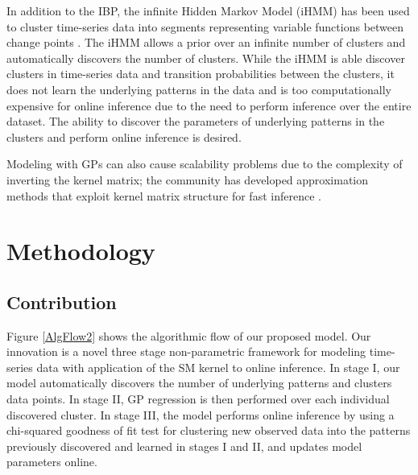 \documentclass{article}
\begin{document}
In addition to the IBP, the infinite Hidden Markov Model (iHMM) has been used to cluster time-series data into segments representing variable functions between change points \cite{BeamiHMM}. The iHMM allows a prior over an infinite number of clusters and automatically discovers the number of clusters. While the iHMM is able discover clusters in time-series data and transition probabilities between the clusters, it does not learn the underlying patterns in the data and is too computationally expensive for online inference due to the need to perform inference over the entire dataset. The ability to discover the parameters of underlying patterns in the clusters and perform online inference is desired.

Modeling with GPs can also cause scalability problems due to the complexity of inverting the kernel matrix; the community has developed approximation methods that exploit kernel matrix structure for fast inference \cite{KISS-GP}.


\section{Methodology}

\subsection{Contribution}
Figure \ref{AlgFlow2} shows the algorithmic flow of our proposed model. Our innovation is a novel three stage non-parametric framework for modeling time-series data with application of the SM kernel to online inference. In stage I, our model automatically discovers the number of underlying patterns and clusters data points. In stage II, GP regression is then performed over each individual discovered cluster. In stage III, the model performs online inference by using a chi-squared goodness of fit test for clustering new observed data into the patterns previously discovered and learned in stages I and II, and updates model parameters online. 
\end{document}
